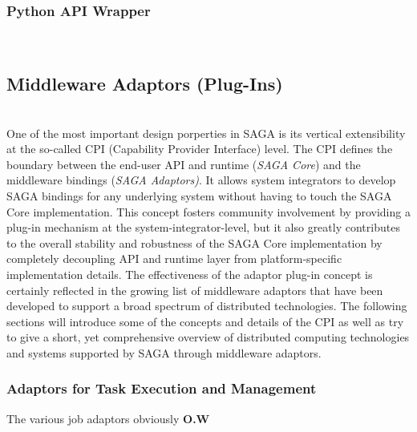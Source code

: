   \subsubsection{Python API Wrapper}
  \\
  

  \subsection{Middleware Adaptors (Plug-Ins)}
  \\
   One of the most important design porperties in SAGA is its vertical
   extensibility at the so-called CPI (Capability Provider Interface) level.
   The CPI defines the boundary between the end-user  API and runtime (\textit{SAGA Core}) and the middleware
   bindings (\textit{SAGA Adaptors)}.  It allows system integrators to develop
   SAGA bindings for any underlying system without having to touch the SAGA
   Core implementation.  This concept fosters community involvement by
   providing a plug-in mechanism at the  system-integrator-level, but it also greatly contributes to the
   overall stability and robustness of the SAGA Core implementation by
   completely decoupling API and runtime layer from platform-specific
   implementation details. The effectiveness of the adaptor plug-in concept is
   certainly reflected in the growing list of middleware adaptors that have
   been developed to support a broad spectrum of distributed technologies. The
   following sections will introduce some of the concepts and details of the
   CPI as well as try to give a short, yet comprehensive overview of
   distributed computing technologies and systems supported by SAGA through
   middleware adaptors.

 
  \subsubsection{Adaptors for Task Execution and Management} 
  The various job adaptors obviously \textbf{O.W}


